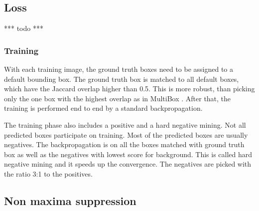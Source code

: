 \documentclass[a4paper,12pt,titlepage, twoside]{article}
\numberwithin{figure}{section}
\begin{document}
\subsection{Loss}
*** todo ***

\subsubsection{Training}
With each training image, the ground truth boxes need to be assigned to a default bounding box. The ground truth box is matched to all default boxes, which have the Jaccard overlap higher than 0.5. This is more robust, than picking only the one box with the highest overlap as in MultiBox \cite{erhan2014scalable}. After that, the training is performed end to end by a standard backpropagation. 

The training phase also includes a positive and a hard negative mining. Not all predicted boxes participate on training. Most of the predicted boxes are usually negatives. The backpropagation is on all the boxes matched with ground truth box as well as the negatives with lowest score for background. This is called hard negative mining and it speeds up the convergence. The negatives are picked with the ratio 3:1 to the positives.

\subsection{Non maxima suppression}
\end{document}
